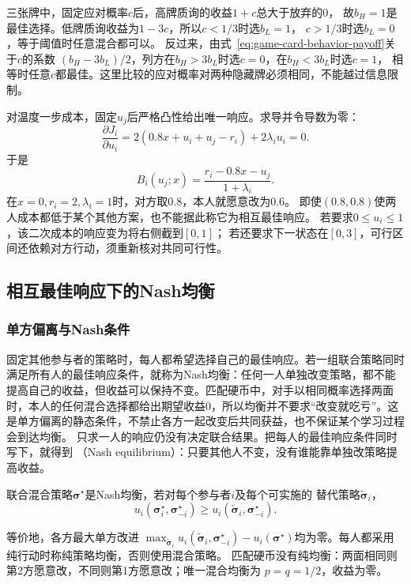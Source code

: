 三张牌中，固定应对概率\(c\)后，高牌质询的收益\(1+c\)总大于放弃的\(0\)，
故\(b_H=1\)是最佳选择。低牌质询收益为\(1-3c\)，所以\(c<1/3\)时选\(b_L=1\)，
\(c>1/3\)时选\(b_L=0\)，等于阈值时任意混合都可以。
反过来，由式~\eqref{eq:game-card-behavior-payoff}关于\(c\)的系数
\((b_H-3b_L)/2\)，列方在\(b_H>3b_L\)时选\(c=0\)，在\(b_H<3b_L\)时选\(c=1\)，
相等时任意\(c\)都最佳。这里比较的应对概率对两种隐藏牌必须相同，不能越过信息限制。

对温度一步成本，固定\(u_j\)后严格凸性给出唯一响应。求导并令导数为零：
\[
  \frac{\partial J_i}{\partial u_i}
  =2(0.8x+u_i+u_j-r_i)+2\lambda_i u_i=0.
\]
于是
\begin{equation}
  B_i(u_j;x)=\frac{r_i-0.8x-u_j}{1+\lambda_i}.
  \label{eq:game-heater-best-response}
\end{equation}
在\(x=0,r_i=2,\lambda_i=1\)时，对方取\(0.8\)，本人就愿意改为\(0.6\)。
即使\((0.8,0.8)\)使两人成本都低于某个其他方案，也不能据此称它为相互最佳响应。
若要求\(0\leq u_i\leq1\)，该二次成本的响应变为将右侧截到\([0,1]\)；
若还要求下一状态在\([0,3]\)，可行区间还依赖对方行动，须重新核对共同可行性。

\subsection{相互最佳响应下的Nash均衡}
\label{sec:game-nash}

\subsubsection{单方偏离与Nash条件}
\label{sec:game-nash-condition}

固定其他参与者的策略时，每人都希望选择自己的最佳响应。若一组联合策略同时满足所有人的最佳响应条件，就称为Nash均衡：任何一人单独改变策略，都不能提高自己的收益，但收益可以保持不变。匹配硬币中，对手以相同概率选择两面时，本人的任何混合选择都给出期望收益\(0\)，所以均衡并不要求“改变就吃亏”。这是单方偏离的静态条件，不禁止各方一起改变后共同获益，也不保证某个学习过程会到达均衡。
只求一人的响应仍没有决定联合结果。把每人的最佳响应条件同时写下，就得到
（Nash equilibrium）：只要其他人不变，没有谁能靠单独改策略提高收益。
\begin{definition}[Nash均衡]
\label{def:game-nash-equilibrium}
联合混合策略\(\bm\sigma^\star\)是Nash均衡，若对每个参与者\(i\)及每个可实施的
替代策略\(\widetilde{\bm\sigma}_i\)，
\begin{equation}
  u_i(\bm\sigma_i^\star,\bm\sigma_{-i}^\star)
  \geq u_i(\widetilde{\bm\sigma}_i,\bm\sigma_{-i}^\star).
  \label{eq:game-nash-no-unilateral-deviation}
\end{equation}
\end{definition}
等价地，各方最大单方改进
\(\max_{\widetilde{\bm\sigma}_i}u_i(\widetilde{\bm\sigma}_i,\bm\sigma_{-i}^\star)
-u_i(\bm\sigma^\star)\)均为零。每人都采用纯行动时称纯策略均衡，否则使用混合策略。
匹配硬币没有纯均衡：两面相同则第2方愿意改，不同则第1方愿意改；唯一混合均衡为
\(p=q=1/2\)，收益为零。

